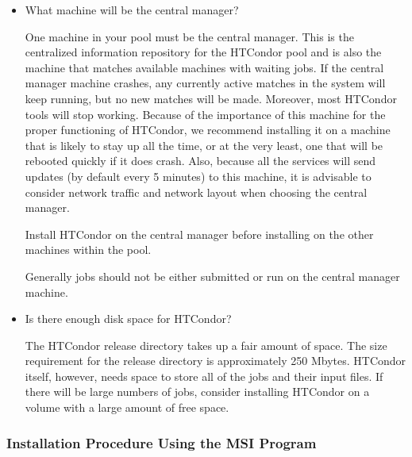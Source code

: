 \begin{itemize} 

\item{What machine will be the central manager?}

One machine in your pool must be the central manager.
This is the
centralized information repository for the HTCondor pool and is also the
machine that matches available machines with waiting
jobs.  If the central manager machine crashes, any currently active
matches in the system will keep running, but no new matches will be
made.  Moreover, most HTCondor tools will stop working.  Because of the
importance of this machine for the proper functioning of HTCondor, we
recommend installing it on a machine that is likely to stay up all the
time, or at the very least, one that will be rebooted quickly if it
does crash.  Also, because all the services will send updates (by
default every 5 minutes) to this machine, it is advisable to consider
network traffic and network layout when choosing the central
manager.

Install HTCondor on the central manager before installing
on the other machines within the pool.

Generally jobs should not be either submitted or run on the central manager machine.

\item{Is there enough disk space for HTCondor?}

The HTCondor release directory takes up a fair amount of space.
The size requirement for the release
directory is approximately 250 Mbytes.
HTCondor itself, however, needs space to store all of the jobs and their
input files.  If there will be large numbers of jobs,
consider installing HTCondor on a volume with a large amount
of free space.

\end{itemize}


\subsubsection{\label{sec:nt-install-procedure}
Installation Procedure Using the MSI Program}

